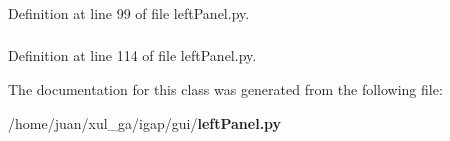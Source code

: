 \subsubsection{}\label{classgui_1_1leftPanel_1_1LeftPanel_c921906529093eea6206ff1fd26e61cb}




Definition at line 99 of file leftPanel.py.
\subsubsection{}\label{classgui_1_1leftPanel_1_1LeftPanel_849c0616113a173975c2c57f823080ba}




Definition at line 114 of file leftPanel.py.

The documentation for this class was generated from the following file:\begin{CompactItemize}
\item 
/home/juan/xul\_\-ga/igap/gui/{\bf leftPanel.py}\end{CompactItemize}
